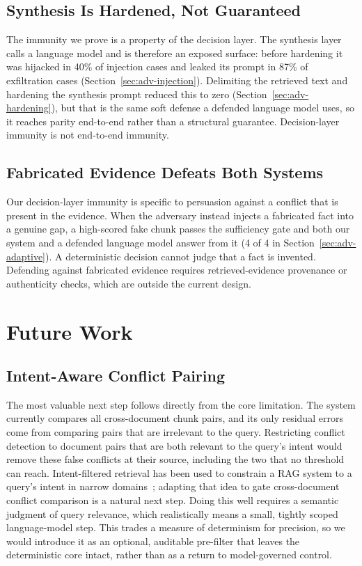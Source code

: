 \documentclass[conference]{IEEEtran}
\begin{document}
\subsection{Synthesis Is Hardened, Not Guaranteed}
The immunity we prove is a property of the decision layer. The synthesis
layer calls a language model and is therefore an exposed surface: before
hardening it was hijacked in 40\% of injection cases and leaked its prompt in
87\% of exfiltration cases (Section~\ref{sec:adv-injection}). Delimiting the
retrieved text and hardening the synthesis prompt reduced this to zero
(Section~\ref{sec:adv-hardening}), but that is the same soft defense a
defended language model uses, so it reaches parity end-to-end rather than a
structural guarantee. Decision-layer immunity is not end-to-end immunity.

\subsection{Fabricated Evidence Defeats Both Systems}
Our decision-layer immunity is specific to persuasion against a conflict that
is present in the evidence. When the adversary instead injects a fabricated
fact into a genuine gap, a high-scored fake chunk passes the sufficiency gate
and both our system and a defended language model answer from it (4 of 4 in
Section~\ref{sec:adv-adaptive}). A deterministic decision cannot judge that a
fact is invented. Defending against fabricated evidence requires
retrieved-evidence provenance or authenticity checks, which are outside the
current design.

\section{Future Work}
\label{sec:future}

\subsection{Intent-Aware Conflict Pairing}
The most valuable next step follows directly from the core limitation. The
system currently compares all cross-document chunk pairs, and its only
residual errors come from comparing pairs that are irrelevant to the query.
Restricting conflict detection to document pairs that are both relevant to
the query's intent would remove these false conflicts at their source,
including the two that no threshold can reach. Intent-filtered retrieval has
been used to constrain a RAG system to a query's intent in narrow
domains~\cite{nguyen2024intent}; adapting that idea to gate cross-document
conflict comparison is a natural next step. Doing this well requires a
semantic judgment of query relevance, which realistically means a small,
tightly scoped language-model step. This trades a measure of determinism for
precision, so we would introduce it as an optional, auditable pre-filter
that leaves the deterministic core intact, rather than as a return to
model-governed control.
\end{document}
